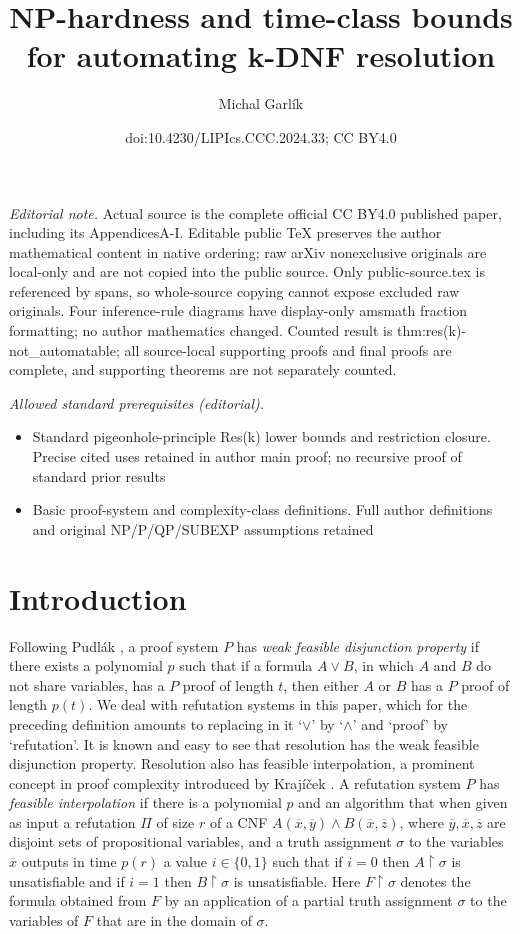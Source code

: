 \documentclass[10pt,a4paper]{article}
\title{NP-hardness and time-class bounds for automating k-DNF resolution}
\author{Michal Garlík}
\date{doi:10.4230/LIPIcs.CCC.2024.33; CC BY4.0}
\theoremstyle{remark}
\newtheorem*{switching lemma}{Switching Lemma}
\newtheorem*{open problem}{Open Problem}
\theoremstyle{definition}
\begin{document}
\maketitle
\noindent\textit{Editorial note.} Actual source is the complete official CC BY4.0 published paper, including its AppendicesA-I. Editable public TeX preserves the author mathematical content in native ordering; raw arXiv nonexclusive originals are local-only and are not copied into the public source. Only public-source.tex is referenced by spans, so whole-source copying cannot expose excluded raw originals. Four inference-rule diagrams have display-only amsmath fraction formatting; no author mathematics changed. Counted result is thm:res(k)-not\_automatable; all source-local supporting proofs and final proofs are complete, and supporting theorems are not separately counted.\par\medskip
\noindent\textit{Allowed standard prerequisites (editorial).}\begin{itemize}
\item Standard pigeonhole-principle Res(k) lower bounds and restriction closure. Precise cited uses retained in author main proof; no recursive proof of standard prior results
\item Basic proof-system and complexity-class definitions. Full author definitions and original NP/P/QP/SUBEXP assumptions retained
\end{itemize}\medskip
\section{Introduction}

Following Pudl\'ak \cite{Pudlak2003}, a proof system $P$ has \emph{weak feasible disjunction property} if there exists a polynomial $p$ such that if a formula $A \lor B$, in which $A$ and $B$ do not share variables, has a $P$ proof of length $t$, then either $A$ or $B$ has a $P$ proof of length $p(t)$. We deal with refutation systems in this paper, which for the preceding definition amounts to replacing in it `$\lor$' by `$\land$' and `proof' by `refutation'. It is known and easy to see that resolution has the weak feasible disjunction property. Resolution also has feasible interpolation, a prominent concept in proof complexity introduced by Kraj\'{i}\v{c}ek \cite{Krajicek1994, Krajicek1997}. A refutation system $P$ has \emph{feasible interpolation} if there is a polynomial $p$ and an algorithm that when given as input a refutation $\Pi$ of size $r$ of a CNF $A(\overline{x}, \overline{y}) \land B(\overline{x}, \overline{z})$, where $\overline{y}, \overline{x}, \overline{z}$ are disjoint sets of propositional variables, and a truth assignment $\sigma$ to the variables $\overline{x}$ outputs in time $p(r)$ a value $i \in \{0,1\}$ such that if $i=0$ then $A \! \restriction \! \sigma$ is unsatisfiable and if $i=1$ then $B \! \restriction \! \sigma$ is unsatisfiable. Here $F \! \restriction \! \sigma$ denotes the formula obtained from $F$ by an application of a partial truth assignment $\sigma$ to the variables of $F$ that are in the domain of $\sigma$.
\end{document}
